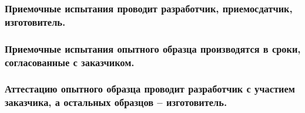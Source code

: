 \documentclass[a4paper]{bsuir-tor}
\begin{document}
\subsubsection{Приемочные испытания проводит разработчик,
  приемосдатчик, изготовитель.}

\subsubsection{Приемочные испытания опытного образца производятся в сроки,
  согласованные с заказчиком.}


\subsubsection{Аттестацию опытного образца проводит разработчик
  с участием заказчика,
  а остальных образцов – изготовитель.}
\end{document}
